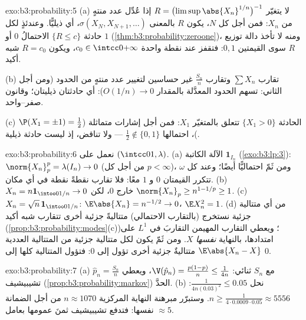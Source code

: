 \begin{solution}{exo:b3:probability:5}
(a) لا يتغيّر $R = \bigl(\limsup\abs{X_n}^{1/n}\bigr)^{-1}$ إذا عُدِّل عدد منتهٍ من $X_n$: فمن أجل كل
$N$، يكون $R$  بالمعنى $\sigma(X_N, X_{N+1}, \dots)$، أي ذيليًّا. وعندئذٍ
لكل حادثة $\{R \leq c\}$ الاحتمالُ $0$ أو $1$ (\cref{thm:b3:probability:zeroone})،
ومنه لا تأخذ دالة توزيع $R$ سوى القيمتين $0, 1$: فتقفز عند
نقطة واحدة $c_0 \in
\intcc0{+\infty}$، ويكون $R = c_0$ شبه أكيد.

(b) تقارب $\sum X_n$ وتقارب $\frac{S_n}n$ غير حساسين لتغيير عدد
منتهٍ من الحدود (ومن أجل الثاني: تسهم الحدود المعدَّلة بالمقدار
$O(1/n) \to 0$): أي حادثتان ذيليتان؛ وقانون صفر--واحد.

(c) الحادثة $\{X_1 > 0\}$ تتعلق بالمتغيّر $X_1$: فمن أجل إشارات 
متماثلة ($\P(X_1 = \pm1) = \frac12$)، احتمالها $\frac12
\notin \{0,1\}$ --- ولا تناقض، إذ ليست حادثة
ذيلية.
\end{solution}

\begin{solution}{exo:b3:probability:6}
نعمل على $(\intcc01, \lambda)$.
(a) الآلة الكاتبة $\mathbf 1_{I_n}$ (\cref{exo:b3:lp:3}): $\norm{X_n}_p^p = \lambda(I_n) \to 0$ (من أجل كل
$p < \infty$)، ومن ثَمّ احتماليًّا أيضًا؛ وعند كل $\omega$
تتكرر القيمتان $0$ و $1$ معًا: فلا تقارب نقطةً نقطة في أي مكان.
(b) $X_n = n\mathbf 1_{\intoo0{1/n}} \to 0$ خارج $0$، لكن $\norm{X_n}_p \geq n^{1 - 1/p} \geq 1$.
(c) $X_n = \sqrt n\,\mathbf 1_{\intoo0{1/n}}$: $\E\abs{X_n} =
n^{-1/2} \to 0$، $\E X_n^2 = 1$.
(d) من أي متتالية جزئية نستخرج (بالتقارب الاحتمالي) متتاليةً
جزئية أخرى تتقارب شبه أكيد (\cref{prop:b3:probability:modes}(c))؛ ويعطي التقارب
المهيمن التقاربَ في $L^1$ على امتدادها، بالنهاية \emph{نفسها}
$X$. ومن ثَمّ يكون لكل متتالية جزئية من المتتالية العددية
$\E\abs{X_n - X}$ متتاليةٌ جزئية أخرى تؤول إلى $0$: فتؤول المتتالية كلها
إلى $0$.
\end{solution}

\begin{solution}{exo:b3:probability:7}
(a) $\hat p_n = \frac{S_n}n$ مع $S_n$ ثنائي: $\V(\hat
p_n) = \frac{p(1-p)}n \leq \frac1{4n}$، ويعطي تشيبيشيف
(\cref{prop:b3:probability:markov}) الحدَّ.
(b) نحل $\frac1{4n(0.03)^2} \leq 0.05$: $n \geq
\frac{1}{4\cdot0.0009\cdot0.05} \approx 5556$. وستبرّر مبرهنة النهاية المركزية
$n \approx 1070$ من أجل الضمانة نفسها: فتدفع تشيبيشيف ثمنَ
عمومها بعامل $\approx 5$.
\end{solution}

